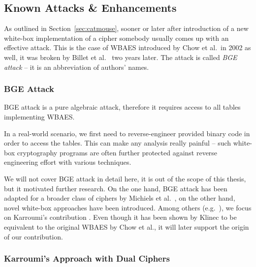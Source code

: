 \subsection{Known Attacks \& Enhancements}
\label{sec:known}

As outlined in Section~\ref{sec:catmouse}, sooner or later after introduction of a new white-box implementation of a cipher somebody usually comes up with an effective attack. This is the case of WBAES introduced by Chow et al.\ in 2002 as well, it was broken by Billet et al.\ \cite{billet2004cryptanalysis} two years later. The attack is called {\em BGE attack} -- it is an abbreviation of authors' names.


\subsubsection{BGE Attack}
	
	BGE attack is a pure algebraic attack, therefore it requires access to all tables implementing WBAES.
	
	\begin{note}
	\label{note:reverse}
		In a real-world scenario, we first need to reverse-engineer provided binary code in order to access the tables. This can make any analysis really painful -- such white-box cryptography programs are often further protected against reverse engineering effort with various techniques.
	\end{note}
	
	We will not cover BGE attack in detail here, it is out of the scope of this thesis, but it motivated further research. On the one hand, BGE attack has been adapted for a broader class of ciphers by Michiels et al.\ \cite{michiels2008cryptanalysis}, on the other hand, novel white-box approaches have been introduced. Among others (e.g.\ \cite{michiels2007cryptographic, xiao2009secure}), we focus on Karroumi's contribution \cite{karroumi2010protecting}. Even though it has been shown by Klinec \cite{klinec2013white} to be equivalent to the original WBAES by Chow et al., it will later support the origin of our contribution.   %

\subsubsection{Karroumi's Approach with Dual Ciphers}
	
